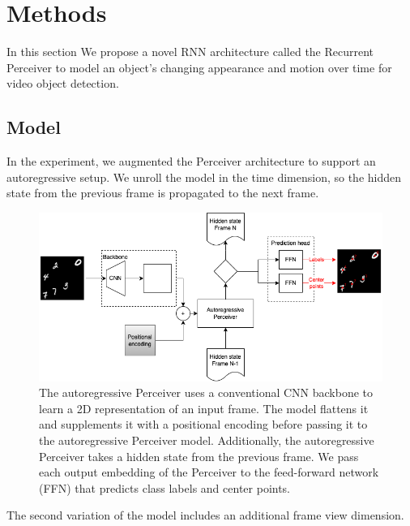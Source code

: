 \section{Methods}  \label{Methods}

In this section We propose a novel RNN architecture called the Recurrent Perceiver to model an object's changing appearance and motion over time for video object detection.

\subsection{Model}

In the experiment, we augmented the Perceiver architecture \cite{jaeglePerceiverGeneralPerception2021} to support an autoregressive setup. We unroll the model in the time dimension, so the hidden state from the previous frame is propagated to the next frame.

\begin{figure}
    \centering
    \includegraphics[width=\textwidth]{figures/figure_methods_model_ar_perceiver.png}
    \caption{The autoregressive Perceiver uses a conventional CNN backbone to learn a 2D representation of an input frame. The model flattens it and supplements it with a positional encoding before passing it to the autoregressive Perceiver model. Additionally, the autoregressive Perceiver takes a hidden state from the previous frame. We pass each output embedding of the Perceiver to the feed-forward network (FFN) that predicts class labels and center points.}
    \label{fig:figure_methods_model_ar_perceiver}
\end{figure}

The second variation of the model includes an additional frame view dimension.


